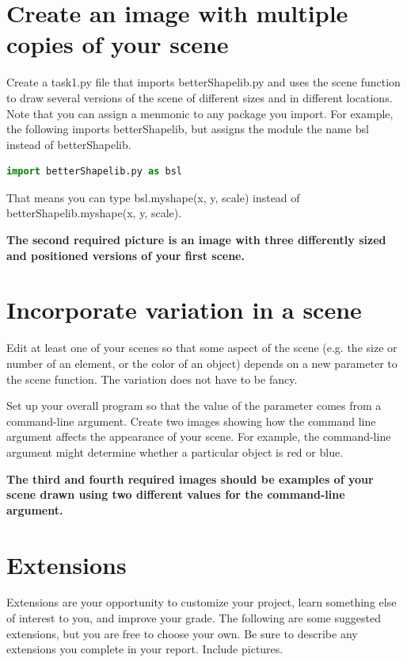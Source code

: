 \documentclass[12pt]{article}
\begin{document}
\section{Create an image with multiple copies of your scene}
Create a task1.py file that imports betterShapelib.py and uses the scene function to draw several versions of the scene of different sizes and in different locations. Note that you can assign a menmonic to any package you import. For example, the following imports betterShapelib, but assigns the module the name bsl instead of betterShapelib.

\begin{lstlisting}[language=Python]
import betterShapelib.py as bsl
\end{lstlisting}  

That means you can type bsl.myshape(x, y, scale) instead of betterShapelib.myshape(x, y, scale).

\textbf{The second required picture is an image with three differently sized and positioned versions of your first scene.}

\section{Incorporate variation in a scene}
Edit at least one of your scenes so that some aspect of the scene (e.g. the size or number of an element, or the color of an object) depends on a new parameter to the scene function. The variation does not have to be fancy.

Set up your overall program so that the value of the parameter comes from a command-line argument. Create two images showing how the command line argument affects the appearance of your scene. For example, the command-line argument might determine whether a particular object is red or blue.

\textbf{The third and fourth required images should be examples of your scene drawn using two different values for the command-line argument.}

\section{Extensions}
Extensions are your opportunity to customize your project, learn something else of interest to you, and improve your grade. The following are some suggested extensions, but you are free to choose your own. Be sure to describe any extensions you complete in your report. Include pictures.
\end{document}

